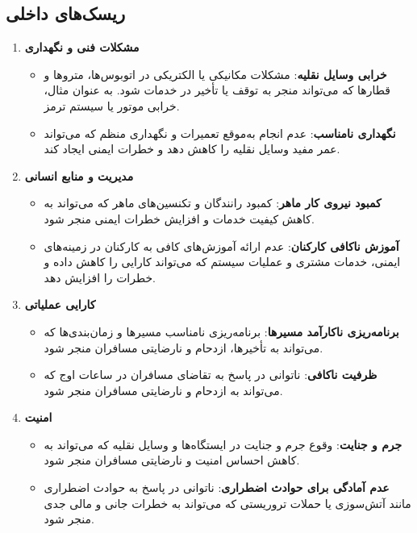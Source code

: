 \subsection{ریسک‌های داخلی}
\begin{enumerate}
	\item \textbf{مشکلات فنی و نگهداری}
	\begin{itemize}
		\item \textbf{خرابی وسایل نقلیه}: مشکلات مکانیکی یا الکتریکی در اتوبوس‌ها، متروها و قطارها که می‌تواند منجر به توقف یا تأخیر در خدمات شود. به عنوان مثال، خرابی موتور یا سیستم ترمز.
		\item \textbf{نگهداری نامناسب}: عدم انجام به‌موقع تعمیرات و نگهداری منظم که می‌تواند عمر مفید وسایل نقلیه را کاهش دهد و خطرات ایمنی ایجاد کند.
	\end{itemize}
	\item \textbf{مدیریت و منابع انسانی}
	\begin{itemize}
		\item \textbf{کمبود نیروی کار ماهر}: کمبود رانندگان و تکنسین‌های ماهر که می‌تواند به کاهش کیفیت خدمات و افزایش خطرات ایمنی منجر شود.
		\item \textbf{آموزش ناکافی کارکنان}: عدم ارائه آموزش‌های کافی به کارکنان در زمینه‌های ایمنی، خدمات مشتری و عملیات سیستم که می‌تواند کارایی را کاهش داده و خطرات را افزایش دهد.
	\end{itemize}
	\item \textbf{کارایی عملیاتی}
	\begin{itemize}
		\item \textbf{برنامه‌ریزی ناکارآمد مسیرها}: برنامه‌ریزی نامناسب مسیرها و زمان‌بندی‌ها که می‌تواند به تأخیرها، ازدحام و نارضایتی مسافران منجر شود.
		\item \textbf{ظرفیت ناکافی}: ناتوانی در پاسخ به تقاضای مسافران در ساعات اوج که می‌تواند به ازدحام و نارضایتی مسافران منجر شود.
	\end{itemize}
	\item \textbf{امنیت}
	\begin{itemize}
		\item \textbf{جرم و جنایت}: وقوع جرم و جنایت در ایستگاه‌ها و وسایل نقلیه که می‌تواند به کاهش احساس امنیت و نارضایتی مسافران منجر شود.
		\item \textbf{عدم آمادگی برای حوادث اضطراری}: ناتوانی در پاسخ به حوادث اضطراری مانند آتش‌سوزی یا حملات تروریستی که می‌تواند به خطرات جانی و مالی جدی منجر شود.
	\end{itemize}
\end{enumerate}

